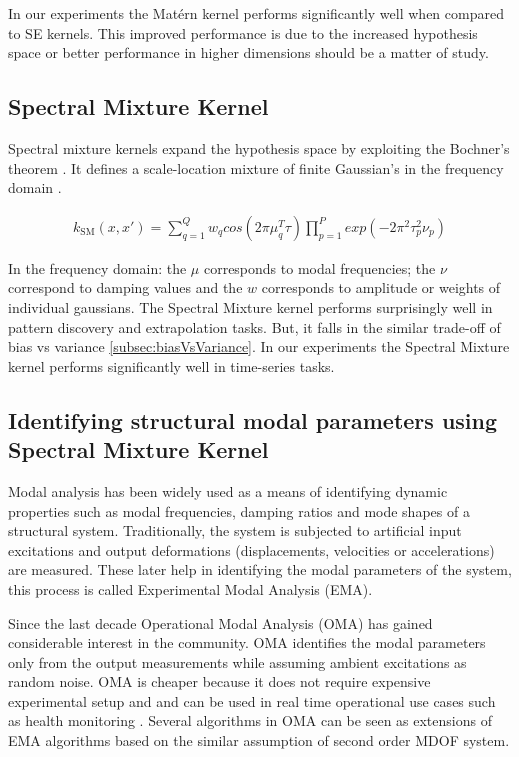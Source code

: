 In our experiments the Mat\'ern kernel performs significantly well when compared to SE kernels. This improved performance is due to the increased hypothesis space or better performance in higher dimensions should be a matter of study.

\subsection{Spectral Mixture Kernel}
Spectral mixture kernels expand the hypothesis space by exploiting the Bochner's theorem \cite{bochner1959lectures}. It defines a scale-location mixture of finite Gaussian's in the frequency domain \cite{wilson2013gaussian}. 

\begin{align}
k_{\textrm{SM}}(x, x') = \sum_{q=1}^{Q}w_{q}cos(2\pi\mu_{q}^{T}\tau)\prod_{p=1}^{P}exp(-2\pi^{2}\tau_{p}^{2}\nu_{p})
\end{align}

In the frequency domain: the $\mu$ corresponds to modal frequencies; the $\nu$ correspond to damping values and the $w$ corresponds to amplitude or weights of individual gaussians. The Spectral Mixture kernel performs surprisingly well in pattern discovery and extrapolation tasks. But, it falls in the similar trade-off of bias vs variance \ref{subsec:biasVsVariance}. In our experiments the Spectral Mixture kernel performs significantly well in time-series tasks.

\subsection{Identifying structural modal parameters using Spectral Mixture Kernel}
Modal analysis has been widely used as a means of identifying dynamic properties such as modal frequencies, damping ratios and mode shapes of a structural system. Traditionally, the system is subjected to artificial input excitations and output deformations (displacements, velocities or accelerations) are measured. These later help in identifying the modal parameters of the system, this process is called Experimental Modal Analysis (EMA). 

Since the last decade Operational Modal Analysis (OMA) has gained considerable interest in the community. OMA identifies the modal parameters only from the output measurements while assuming ambient excitations as random noise. OMA is cheaper because it does not require expensive experimental setup and and can be used in real time operational use cases such as health monitoring \cite{peeters2005industrial} \cite{shahdin2010correlating} \cite{rainieri2007automated}. Several algorithms in OMA can be seen as extensions of EMA algorithms based on the similar assumption of second order MDOF system.

